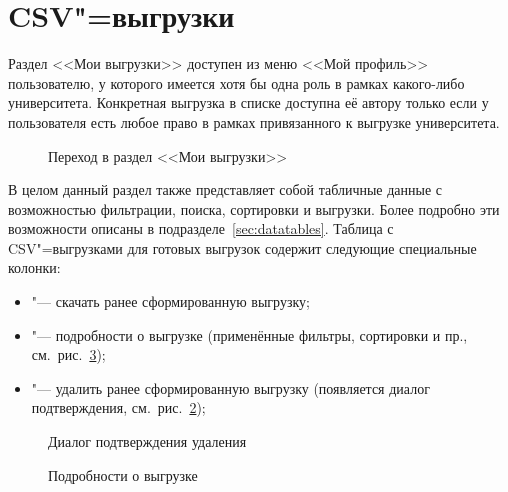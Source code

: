 \graphicspath{ {images/csv_dumps/} }
\section{CSV"=выгрузки} \label{sec:csv_dumps}

Раздел <<Мои выгрузки>> доступен из меню <<Мой профиль>> пользователю, у которого имеется хотя бы одна роль в рамках какого-либо университета. Конкретная выгрузка в списке доступна её автору только если у пользователя есть любое право в рамках привязанного к выгрузке университета.

\begin{figure}[H]
	\caption{Переход в раздел <<Мои выгрузки>>}
	\label{img:employee:my_dumps}
\end{figure}

В целом данный раздел также представляет собой табличные данные с возможностью фильтрации, поиска, сортировки и выгрузки.
Более подробно эти возможности описаны в подразделе~\ref{sec:datatables}. Таблица с CSV"=выгрузками для готовых выгрузок 
содержит следующие специальные колонки:
\begin{itemize}
	\item {} "--- скачать ранее сформированную выгрузку;
	\item {} "--- подробности о выгрузке (применённые фильтры, сортировки и пр.,
	см.\ рис.~\ref{img:csv_dumps:details_csv});
	\item {} "--- удалить ранее сформированную выгрузку (появляется диалог подтверждения,
	см.\ рис.~\ref{img:csv_dumps:confirm_remove_csv});
\end{itemize}

\begin{figure}[H]
	\caption{Диалог подтверждения удаления}
	\label{img:csv_dumps:confirm_remove_csv}
\end{figure}
\begin{figure}[H]
	\caption{Подробности о выгрузке}
	\label{img:csv_dumps:details_csv}
\end{figure}
